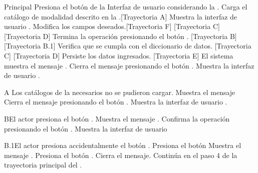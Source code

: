 \begin{UCtrayectoria}{Principal}
	\UCpaso[\UCactor] Presiona el botón \BtnLapiz de la Interfaz de usuario  considerando la  .
	\UCpaso Carga el catálogo de modalidad descrito en la .[Trayectoria A]
	\UCpaso Muestra la interfaz de usuario .
	\UCpaso[\UCactor] Modifica los campos deseados.[Trayectoria F] [Trayectoria C] [Trayectoria D]
	\UCpaso[\UCactor] Termina la operación presionando el botón . [Trayectoria B] [Trayectoria B.1]
	\UCpaso Verifica que se cumpla con el diccionario de datos. [Trayectoria C] [Trayectoria D]
	\UCpaso Persiste los datos ingresados. [Trayectoria E]
	\UCpaso El sistema muestra el mensaje .
	\UCpaso[\UCactor] Cierra el mensaje presionando el botón .
	\UCpaso Muestra la interfaz de usuario .
\end{UCtrayectoria}
\begin{UCtrayectoriaA}{A}{ Los catálogos de la  necesarios no se pudieron cargar.}
    \UCpaso Muestra el mensaje 
    \UCpaso[\UCactor] Cierra el mensaje presionando el botón .
    \UCpaso Muestra la interfaz de usuario .
\end{UCtrayectoriaA}

\begin{UCtrayectoriaA}{B}{El actor presiona el botón .}
	\UCpaso Muestra el mensaje .
	\UCpaso[\UCactor] Confirma la operación presionando el botón .
	\UCpaso Muestra la interfaz de usuario 
\end{UCtrayectoriaA}

\begin{UCtrayectoriaA}{B.1}{El actor presiona accidentalmente el botón .}
	\UCpaso[\UCactor] Presiona el botón 
	\UCpaso Muestra el mensaje .
	\UCpaso[\UCactor] Presiona el botón .
	\UCpaso Cierra el mensaje.
	\UCpaso Continúa en el paso 4 de la trayectoria principal del .
\end{UCtrayectoriaA}

